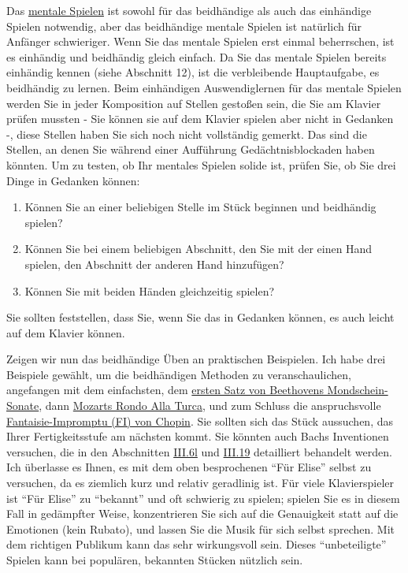 Das \hyperlink{c1ii12mental}{mentale Spielen} ist sowohl für das beidhändige als auch das einhändige Spielen notwendig, aber das beidhändige mentale Spielen ist natürlich für Anfänger schwieriger.
Wenn Sie das mentale Spielen erst einmal beherrschen, ist es einhändig und beidhändig gleich einfach.
Da Sie das mentale Spielen bereits einhändig kennen (siehe Abschnitt 12), ist die verbleibende Hauptaufgabe, es beidhändig zu lernen.
Beim einhändigen Auswendiglernen für das mentale Spielen werden Sie in jeder Komposition auf Stellen gestoßen sein, die Sie am Klavier prüfen mussten - Sie können sie auf dem Klavier spielen aber nicht in Gedanken -, diese Stellen haben Sie sich noch nicht vollständig gemerkt.
Das sind die Stellen, an denen Sie während einer Aufführung Gedächtnisblockaden haben könnten.
Um zu testen, ob Ihr mentales Spielen solide ist, prüfen Sie, ob Sie drei Dinge in Gedanken können:

\begin{enumerate}[label={\arabic*.}] 
 \item Können Sie an einer beliebigen Stelle im Stück beginnen und beidhändig spielen?
 \item Können Sie bei einem beliebigen Abschnitt, den Sie mit der einen Hand spielen, den Abschnitt der anderen Hand hinzufügen?
 \item Können Sie mit beiden Händen gleichzeitig spielen?
 \end{enumerate}
Sie sollten feststellen, dass Sie, wenn Sie das in Gedanken können, es auch leicht auf dem Klavier können.

Zeigen wir nun das beidhändige Üben an praktischen Beispielen.
Ich habe drei Beispiele gewählt, um die beidhändigen Methoden zu veranschaulichen, angefangen mit dem einfachsten, dem \hyperlink{c1ii25b}{ersten Satz von Beethovens Mondschein-Sonate}, dann \hyperlink{c1ii25c}{Mozarts Rondo Alla Turca}, und zum Schluss die anspruchsvolle \hyperlink{c1ii25d}{Fantaisie-Impromptu (FI) von Chopin}.
Sie sollten sich das Stück aussuchen, das Ihrer Fertigkeitsstufe am nächsten kommt.
Sie könnten auch Bachs Inventionen versuchen, die in den Abschnitten \hyperlink{c1iii6l}{III.6l} und \hyperlink{c1iii19}{III.19} detailliert behandelt werden.
Ich überlasse es Ihnen, es mit dem oben besprochenen \enquote{Für Elise} selbst zu versuchen, da es ziemlich kurz und relativ geradlinig ist.
Für viele Klavierspieler ist \enquote{Für Elise} zu \enquote{bekannt} und oft schwierig zu spielen; spielen Sie es in diesem Fall in gedämpfter Weise, konzentrieren Sie sich auf die Genauigkeit statt auf die Emotionen (kein Rubato), und lassen Sie die Musik für sich selbst sprechen.
Mit dem richtigen Publikum kann das sehr wirkungsvoll sein.
Dieses \enquote{unbeteiligte} Spielen kann bei populären, bekannten Stücken nützlich sein.

